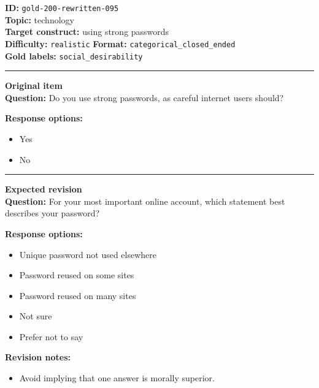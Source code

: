 \documentclass[10pt,a4paper]{article}
\newcommand{\sectionline}{\vspace{0.15em}\hrule\vspace{0.35em}}
\begin{document}
\begin{tcolorbox}[colframe=FlawRed,colback=white,colbacktitle=FlawRed!9,coltitle=black,title={Item 095\hfill Flawed item}]
\textbf{ID:} \texttt{gold-200-rewritten-095}\\
\textbf{Topic:} technology\\
\textbf{Target construct:} using strong passwords\\
\textbf{Difficulty:} \texttt{realistic} \quad \textbf{Format:} \texttt{categorical\_closed\_ended}\\
\textbf{Gold labels:} \texttt{social\_desirability}\\
\sectionline
\textbf{Original item}\\
\textbf{Question:} Do you use strong passwords, as careful internet users should?
\par\textbf{Response options:}
\begin{itemize}
\item Yes
\item No
\end{itemize}
\sectionline
\textbf{Expected revision}\\
\textbf{Question:} For your most important online account, which statement best describes your password?
\par\textbf{Response options:}
\begin{itemize}
\item Unique password not used elsewhere
\item Password reused on some sites
\item Password reused on many sites
\item Not sure
\item Prefer not to say
\end{itemize}
\par\textbf{Revision notes:}
\begin{itemize}
\item Avoid implying that one answer is morally superior.
\end{itemize}
\end{tcolorbox}
\end{document}
